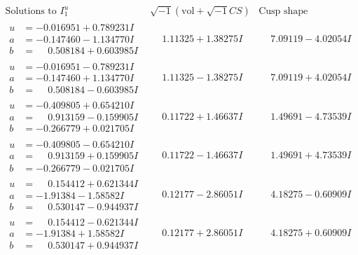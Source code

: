\documentclass[1p]{elsarticle_modified}
\theoremstyle{definition}
\newcommand{\I}{\sqrt{-1}}
\begin{document}
$$\begin{array}{c|c|c}  
\text{Solutions to }I^u_{1}& \I (\text{vol} + \sqrt{-1}CS) & \text{Cusp shape}\\
 \hline 
\begin{aligned}
u &= -0.016951 + 0.789231 I \\
a &= -0.147460 - 1.134770 I \\
b &= \phantom{-}0.508184 + 0.603985 I\end{aligned}
 & \phantom{-}1.11325 + 1.38275 I & \phantom{-}7.09119 - 4.02054 I \\ \hline\begin{aligned}
u &= -0.016951 - 0.789231 I \\
a &= -0.147460 + 1.134770 I \\
b &= \phantom{-}0.508184 - 0.603985 I\end{aligned}
 & \phantom{-}1.11325 - 1.38275 I & \phantom{-}7.09119 + 4.02054 I \\ \hline\begin{aligned}
u &= -0.409805 + 0.654210 I \\
a &= \phantom{-}0.913159 - 0.159905 I \\
b &= -0.266779 + 0.021705 I\end{aligned}
 & \phantom{-}0.11722 + 1.46637 I & \phantom{-}1.49691 - 4.73539 I \\ \hline\begin{aligned}
u &= -0.409805 - 0.654210 I \\
a &= \phantom{-}0.913159 + 0.159905 I \\
b &= -0.266779 - 0.021705 I\end{aligned}
 & \phantom{-}0.11722 - 1.46637 I & \phantom{-}1.49691 + 4.73539 I \\ \hline\begin{aligned}
u &= \phantom{-}0.154412 + 0.621344 I \\
a &= -1.91384 - 1.58582 I \\
b &= \phantom{-}0.530147 - 0.944937 I\end{aligned}
 & \phantom{-}0.12177 - 2.86051 I & \phantom{-}4.18275 - 0.60909 I \\ \hline\begin{aligned}
u &= \phantom{-}0.154412 - 0.621344 I \\
a &= -1.91384 + 1.58582 I \\
b &= \phantom{-}0.530147 + 0.944937 I\end{aligned}
 & \phantom{-}0.12177 + 2.86051 I & \phantom{-}4.18275 + 0.60909 I \\ \hline\begin{aligned}

\end{aligned}
\end{array}$$
\end{document}
